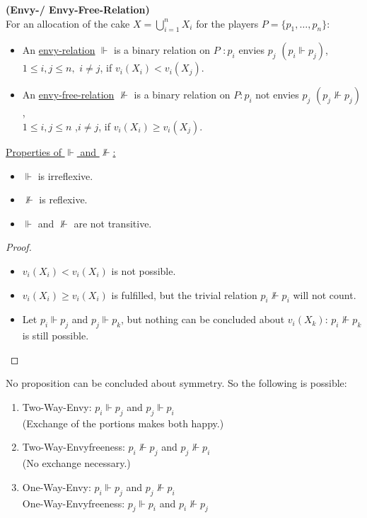 \begin{defi}{\textbf{(Envy-/ Envy-Free-Relation)}}\\
 For an allocation of the cake $X=\bigcup\limits_{i=1}^n X_i$ for the players $P=\{p_1,\dots,p_n\}$:
 \begin{itemize}
  \item An \underline{envy-relation} $\Vdash$ is a binary relation on $P$ %
  $:p_i$ envies 
        $p_j$ $(p_i\Vdash p_j)$, $1\leq i,j\leq n,$ $i\neq j$, if $v_i(X_i)<v_i(X_j)$.
  \item An \underline{envy-free-relation} $\nVdash$ is a binary relation on $P:p_i$ not envies $p_j$ $(p_j
        \nVdash p_j)$,\\$1\leq i,j\leq n$ ,$i\neq j$, if $v_i(X_i)\geq v_i(X_j)$.
 \end{itemize}
\end{defi}
\underline{Properties of $\Vdash$ and $\nVdash$:}
\begin{itemize}
 \item $\Vdash$ is irreflexive.
 \item $\nVdash$ is reflexive.
 \item $\Vdash$ and $\nVdash$ are not transitive.
 \end{itemize}
\begin{proof}
	\begin{itemize}
 		\item $v_i(X_i)<v_i(X_i)$ is not possible.
 		\item $v_i(X_i)\geq v_i(X_i)$ is fulfilled, but the trivial relation $p_i \nVdash p_i$ will not count.
 		\item Let $p_i\Vdash p_j$ and $p_j\Vdash p_k$, but nothing can be concluded about $v_i(X_k)$: $p_i\nVdash p_k$ is still possible.
	\end{itemize}
\end{proof}
No proposition can be concluded about symmetry. So the following is possible:
\begin{enumerate}
 \item Two-Way-Envy: $p_i\Vdash p_j$ and $p_j\Vdash p_i$\\(Exchange of the portions makes both happy.)
 \item Two-Way-Envyfreeness: $p_i\nVdash p_j$ and $p_j\nVdash p_i$\\(No exchange necessary.)
 \item One-Way-Envy: $p_i\Vdash p_j$ and $p_j\nVdash p_i$\\
       One-Way-Envyfreeness: $p_j\Vdash p_i$ and $p_i\nVdash p_j$
\end{enumerate}
